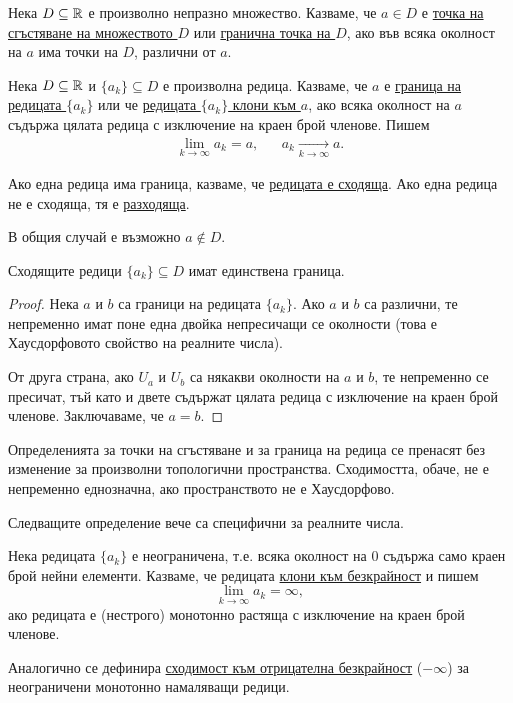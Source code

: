 \documentclass[numbers=endperiod, DIV=15, bibliography=totocnumbered]{scrartcl}
\begin{document}
\begin{definition}
  Нека $D \subseteq \mathbb{R}$ е произволно непразно множество. Казваме, че $a \in D$ е \uline{точка на сгъстяване на множеството $D$} или \uline{гранична точка на $D$}, ако във всяка околност на $a$ има точки на $D$, различни от $a$.
\end{definition}

\begin{definition}
  Нека $D \subseteq \mathbb{R}$ и $\{ a_k \} \subseteq D$ е произволна редица. Казваме, че $a$ е \uline{граница на редицата $\{ a_k \}$} или че \uline{редицата $\{ a_k \}$ клони към $a$}, ако всяка околност на $a$ съдържа цялата редица с изключение на краен брой членове. Пишем
  \begin{align*}
    \lim_{k \to \infty} a_k = a,
    &&
    a_k \underset {k \to \infty} \longrightarrow a.
  \end{align*}

  Ако една редица има граница, казваме, че \uline{редицата е сходяща}. Ако една редица не е сходяща, тя е \uline{разходяща}.
\end{definition}
\begin{note}
  В общия случай е възможно $a \not\in D$.
\end{note}

\begin{proposition}
  Сходящите редици $\{ a_k \} \subseteq D$ имат единствена граница.
\end{proposition}
\begin{proof}
  Нека $a$ и $b$ са граници на редицата $\{ a_k \}$. Ако $a$ и $b$ са различни, те непременно имат поне една двойка непресичащи се околности (това е Хаусдорфовото свойство на реалните числа).

  От друга страна, ако $U_a$ и $U_b$ са някакви околности на $a$ и $b$, те непременно се пресичат, тъй като и двете съдържат цялата редица с изключение на краен брой членове. Заключаваме, че $a = b$.
\end{proof}

\begin{note}
  Определенията за точки на сгъстяване и за граница на редица се пренасят без изменение за произволни топологични пространства. Сходимостта, обаче, не е непременно еднозначна, ако пространството не е Хаусдорфово.

  Следващите определение вече са специфични за реалните числа.
\end{note}

\begin{definition}
  Нека редицата $\{ a_k \}$ е неограничена, т.е. всяка околност на $0$ съдържа само краен брой нейни елементи. Казваме, че редицата \uline{клони към безкрайност} и пишем
  \begin{displaymath}
    \lim_{k \to \infty} a_k = \infty,
  \end{displaymath}
  ако редицата е (нестрого) монотонно растяща с изключение на краен брой членове.

  Аналогично се дефинира \uline{сходимост към отрицателна безкрайност} ($-\infty$) за неограничени монотонно намаляващи редици.
\end{definition}
\end{document}
